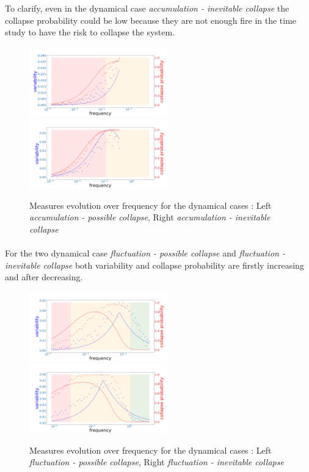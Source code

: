 \documentclass{article}
\begin{document}
To clarify, even in the dynamical case \textit{accumulation - inevitable collapse} the collapse probability could be low because they are not enough fire in the time study to have the risk to collapse the system.

\begin{figure}[h!]
\begin{center}
\includegraphics[width=6cm]{results/measures_acc_possible.png}
\includegraphics[width=6cm]{results/measures_acc_inevitable.png} 
\end{center}
\caption{\label{fig:temp}Measures evolution over frequency for the dynamical cases : Left \textit{accumulation - possible collapse}, Right \textit{accumulation - inevitable collapse}}
\end{figure}



\paragraph{}
For the two dynamical case \textit{fluctuation - possible collapse} and \textit{fluctuation - inevitable collapse} both variability and collapse probability are firstly increasing and after decreasing. 



\begin{figure}[h!]
\begin{center}
\includegraphics[width=6cm]{results/measures_fluctuation_possible.png} \includegraphics[width=6cm]{results/measures_fluctuation_inevitable.png}
\end{center}
\caption{\label{fig:temp}Measures evolution over frequency for the dynamical cases : Left \textit{fluctuation - possible collapse}, Right \textit{fluctuation - inevitable collapse}}
\end{figure}
\end{document}
